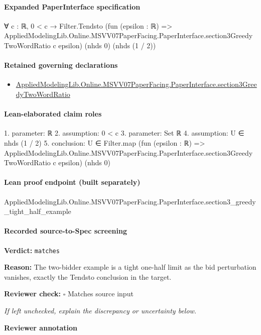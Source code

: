 \documentclass[10pt]{article}
\newcommand{\reviewerbox}{%
  \par\noindent\fbox{\parbox{0.96\linewidth}{\rule{0pt}{0.38in}}}\par
}
\newcommand{\reviewmatch}[1]{%
  \par\noindent\textbf{Reviewer check:} $\square$\; #1\par
  \noindent\emph{If left unchecked, explain the discrepancy or uncertainty below.}\par
}
\begin{document}
\paragraph{Expanded PaperInterface specification}
\begin{ReviewVerbatim}
∀ {c : ℝ},
  0 < c →
    Filter.Tendsto
      (fun (epsilon : ℝ) =>
        AppliedModelingLib.Online.MSVV07PaperFacing.PaperInterface.section3GreedyTwoWordRatio c epsilon)
      (nhds 0) (nhds (1 / 2))
\end{ReviewVerbatim}

\paragraph{Retained governing declarations}
\begin{itemize}\raggedright
\item \hyperlink{governing-declaration-a116f9f368eea84c}{Applied\allowbreak{}Modeling\allowbreak{}Lib.\allowbreak{}Online.\allowbreak{}MSVV07\allowbreak{}Paper\allowbreak{}Facing.\allowbreak{}Paper\allowbreak{}Interface.\allowbreak{}section3\allowbreak{}Greedy\allowbreak{}Two\allowbreak{}Word\allowbreak{}Ratio}
\end{itemize}
\paragraph{Lean-elaborated claim roles}\begin{ReviewVerbatim}
1. parameter: ℝ
2. assumption: 0 < c
3. parameter: Set ℝ
4. assumption: U ∈ nhds (1 / 2)
5. conclusion: U ∈
  Filter.map
    (fun (epsilon : ℝ) =>
      AppliedModelingLib.Online.MSVV07PaperFacing.PaperInterface.section3GreedyTwoWordRatio c epsilon)
    (nhds 0)
\end{ReviewVerbatim}

\paragraph{Lean proof endpoint (built separately)}\begin{ReviewVerbatim}
AppliedModelingLib.Online.MSVV07PaperFacing.PaperInterface.section3_greedy_tight_half_example
\end{ReviewVerbatim}

\paragraph{Recorded source-to-Spec screening}
\textbf{Verdict:} \texttt{matches}
\\
{\raggedright
\textbf{Reason:} The two-\allowbreak{}bidder example is a tight one-\allowbreak{}half limit as the bid perturbation vanishes, exactly the Tendsto conclusion in the target.\allowbreak{}
\par}
\reviewmatch{Matches source input}
\noindent\textbf{Reviewer annotation}\par
\reviewerbox
\clearpage
\hypertarget{source-claim-79bf450f9f3201b9}{}
\end{document}
